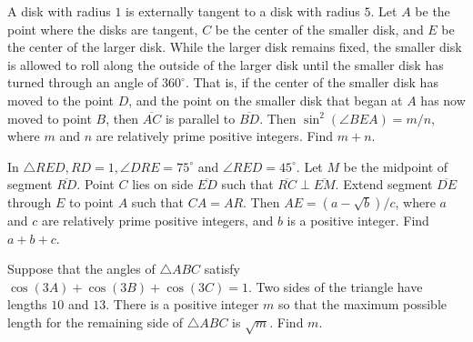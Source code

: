 \begin{question}[name={2014 AIME I, \href{https://artofproblemsolving.com/community/c4p3428804}{Problem 10}}]
	A disk with radius $1$ is externally tangent to a disk with radius $5$. Let $A$ be the point where the disks are tangent, $C$ be the center of the smaller disk, and $E$ be the center of the larger disk. While the larger disk remains fixed, the smaller disk is allowed to roll along the outside of the larger disk until the smaller disk has turned through an angle of $360^\circ$. That is, if the center of the smaller disk has moved to the point $D$, and the point on the smaller disk that began at $A$ has now moved to point $B$, then $\overline{AC}$ is parallel to $\overline{BD}$. Then $\sin^2(\angle BEA)={m}/{n}$, where $m$ and $n$ are relatively prime positive integers. Find $m+n$.
\end{question}


%	









\begin{question}[name={2014 AIME II, \href{https://artofproblemsolving.com/community/c4p3444115}{Problem 11}}]
	In $\triangle RED, RD =1, \angle DRE = 75^\circ$ and $\angle RED = 45^\circ$. Let $M$ be the midpoint of segment $\overline{RD}$. Point $C$ lies on side $\overline{ED}$ such that $\overline{RC} \perp \overline{EM}$. Extend segment $\overline{DE}$ through $E$ to point $A$ such that $CA = AR$. Then $AE = (a-\sqrt{b})/{c}$, where $a$ and $c$ are relatively prime positive integers, and $b$ is a positive integer. Find $a+b+c$.
\end{question}


%	










\begin{question}[name={2014 AIME II, \href{https://artofproblemsolving.com/community/c4p3444116}{Problem 12}}]
	Suppose that the angles of $\triangle ABC$ satisfy $\cos(3A) + \cos(3B) + \cos(3C) = 1$. Two sides of the triangle have lengths $10$ and $13$. There is a positive integer $m$ so that the maximum possible length for the remaining side of $\triangle ABC$ is $\sqrt{m}$. Find $m$.	
\end{question}


